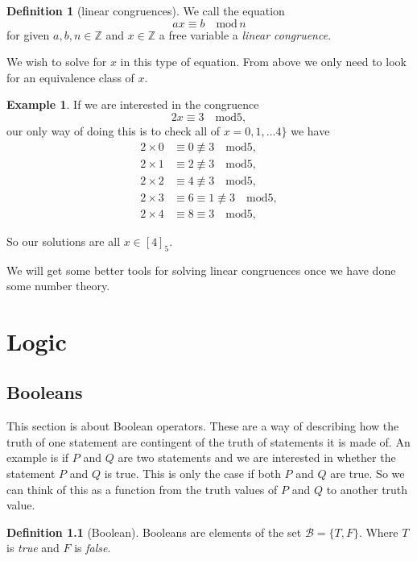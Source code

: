 \documentclass[
]{book}
\theoremstyle{definition}
\newtheorem{definition}{Definition}[chapter]
\theoremstyle{definition}
\newtheorem{example}{Example}[chapter]
\theoremstyle{definition}
\theoremstyle{definition}
\theoremstyle{remark}
\begin{document}
\begin{definition}[linear congruences]
We call the equation
\[ ax \equiv b \quad \mbox{mod} \, n  \]
for given \(a, b, n \in \mathbb{Z}\) and \(x \in \mathbb{Z}\) a free variable a \emph{linear congruence}.

We wish to solve for \(x\) in this type of equation. From above we only need to look for an equivalence class of \(x\).
\end{definition}

\begin{example}
If we are interested in the congruence
\[ 2x \equiv 3 \quad \mbox{mod} 5,  \] our only way of doing this is to check all of \(x= 0,1, \dots 4\}\) we have
\begin{align*}
2\times 0 &\equiv 0 \not\equiv 3 \quad \mbox{mod} 5,\\
2 \times 1 &\equiv 2 \not\equiv 3 \quad \mbox{mod} 5,\\
2 \times 2 & \equiv 4 \not\equiv 3 \quad \mbox{mod} 5,\\
2 \times 3 &\equiv 6 \equiv 1 \not\equiv 3 \quad \mbox{mod} 5,\\
2 \times 4 &\equiv 8 \equiv 3 \quad \mbox{mod} 5,
\end{align*}

So our solutions are all \(x \in [4]_5\).
\end{example}

We will get some better tools for solving linear congruences once we have done some number theory.

\chapter{Logic}\label{logic}

\section{Booleans}\label{booleans}

This section is about Boolean operators. These are a way of describing how the truth of one statement are contingent of the truth of statements it is made of. An example is if \(P\) and \(Q\) are two statements and we are interested in whether the statement \(P\) and \(Q\) is true. This is only the case if both \(P\) and \(Q\) are true. So we can think of this as a function from the truth values of \(P\) and \(Q\) to another truth value.

\begin{definition}[Boolean]
Booleans are elements of the set \(\mathcal{B}=\{T,F\}\). Where \(T\) is \emph{true} and \(F\) is \emph{false}.
\end{definition}
\end{document}
